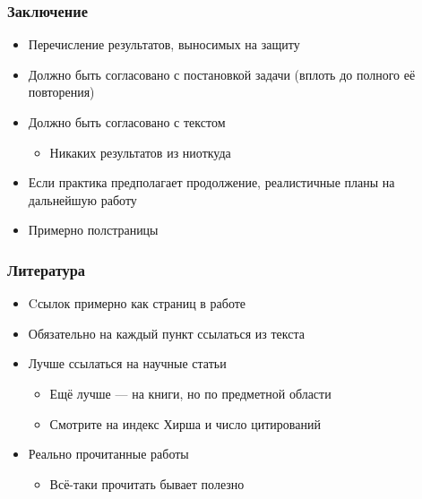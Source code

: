 \documentclass{../../slides-style}
\begin{document}
    \begin{frame}
        \frametitle{Заключение}
        \begin{itemize}
            \item Перечисление результатов, выносимых на защиту
            \item Должно быть согласовано с постановкой задачи (вплоть до полного её повторения)
            \item Должно быть согласовано с текстом
            \begin{itemize}
                \item Никаких результатов из ниоткуда
            \end{itemize}
            \item Если практика предполагает продолжение, реалистичные планы на дальнейшую работу
            \item Примерно полстраницы
        \end{itemize}
    \end{frame}

    \begin{frame}
        \frametitle{Литература}
        \begin{itemize}
            \item Cсылок примерно как страниц в работе
            \item Обязательно на каждый пункт ссылаться из текста
            \item Лучше ссылаться на научные статьи
            \begin{itemize}
                \item Ещё лучше --- на книги, но по предметной области
                \item Смотрите на индекс Хирша и число цитирований
            \end{itemize}
            \item Реально прочитанные работы
            \begin{itemize}
                \item Всё-таки прочитать бывает полезно
            \end{itemize}
        \end{itemize}
    \end{frame}
\end{document}
